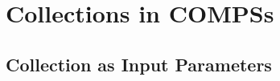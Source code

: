 \section{Collections in COMPSs}
\label{sec:col}

\subsection{Collection as Input Parameters}
\label{subsec:col_in}
